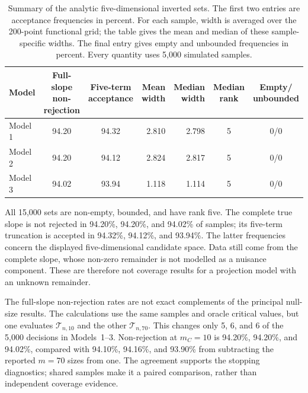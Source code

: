 \begin{table}[htbp]
    \centering
    \small
    \caption[Five-dimensional inverted-set summaries]{Summary of the analytic
    five-dimensional inverted sets.  The first two entries are acceptance
    frequencies in percent.  For each sample, width is averaged over the
    200-point functional grid; the table gives the mean and median of these
    sample-specific widths.  The final entry gives empty and unbounded
    frequencies in percent.  Every quantity uses 5,000 simulated samples.}
    \label{tab:inference-confidence-summary}
    \begin{tabular}{@{}lccrrcc@{}}
        \toprule
        Model & \shortstack{Full-slope\\non-rejection}
              & \shortstack{Five-term\\acceptance}
              & \shortstack{Mean\\width}
              & \shortstack{Median\\width}
              & \shortstack{Median\\rank}
              & \shortstack{Empty/\\unbounded} \\
        \midrule
        Model 1 & 94.20 & 94.32 & 2.810 & 2.798 & 5 & 0/0 \\
        Model 2 & 94.20 & 94.12 & 2.824 & 2.817 & 5 & 0/0 \\
        Model 3 & 94.02 & 93.94 & 1.118 & 1.114 & 5 & 0/0 \\
        \bottomrule
    \end{tabular}
\end{table}

\begin{samepage}
All 15,000 sets are non-empty, bounded, and have rank five.  The complete
true slope is not rejected in 94.20\%, 94.20\%, and 94.02\% of samples; its
five-term truncation is accepted in 94.32\%, 94.12\%, and 93.94\%.
The latter frequencies concern the displayed five-dimensional candidate
space.  Data still come from the complete slope, whose non-zero remainder
is not modelled as a nuisance component.  These are therefore not coverage
results for a projection model with an unknown remainder.
\par
\end{samepage}

The full-slope non-rejection rates are not exact complements of the
principal null-size results.  The calculations use the same samples and oracle
critical values, but one evaluates $\mathcal T_{n,10}$ and the other
$\mathcal T_{n,70}$.  This changes
only 5, 6, and 6 of the 5,000 decisions in Models~1--3.  Non-rejection at
$m_C=10$ is 94.20\%, 94.20\%, and 94.02\%, compared with 94.10\%, 94.16\%,
and 93.90\% from subtracting the reported $m=70$ sizes from one.  The agreement
supports the stopping diagnostics; shared samples make it a paired comparison,
rather than independent coverage evidence.

